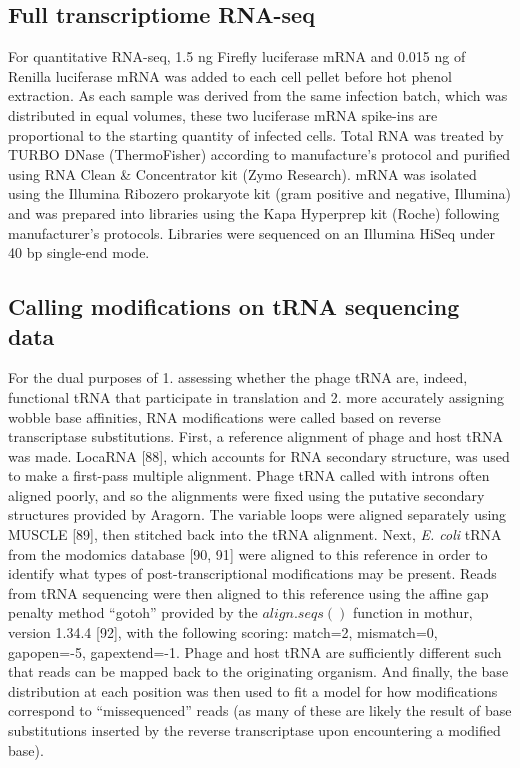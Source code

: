 \documentclass[12pt,twoside]{mitthesis-manusdown}
\begin{document}
\subsection{Full transcriptiome
RNA-seq}\label{full-transcriptiome-rna-seq}

For quantitative RNA-seq, 1.5 ng Firefly luciferase mRNA and 0.015 ng of
Renilla luciferase mRNA was added to each cell pellet before hot phenol
extraction. As each sample was derived from the same infection batch,
which was distributed in equal volumes, these two luciferase mRNA
spike-ins are proportional to the starting quantity of infected cells.
Total RNA was treated by TURBO DNase (ThermoFisher) according to
manufacture's protocol and purified using RNA Clean \& Concentrator kit
(Zymo Research). mRNA was isolated using the Illumina Ribozero
prokaryote kit (gram positive and negative, Illumina) and was prepared
into libraries using the Kapa Hyperprep kit (Roche) following
manufacturer's protocols. Libraries were sequenced on an Illumina HiSeq
under 40 bp single-end mode.

\subsection{Calling modifications on tRNA sequencing
data}\label{calling-modifications-on-trna-sequencing-data}

For the dual purposes of 1. assessing whether the phage tRNA are,
indeed, functional tRNA that participate in translation and 2. more
accurately assigning wobble base affinities, RNA modifications were
called based on reverse transcriptase substitutions. First, a reference
alignment of phage and host tRNA was made. LocaRNA {[}88{]}, which
accounts for RNA secondary structure, was used to make a first-pass
multiple alignment. Phage tRNA called with introns often aligned poorly,
and so the alignments were fixed using the putative secondary structures
provided by Aragorn. The variable loops were aligned separately using
MUSCLE {[}89{]}, then stitched back into the tRNA alignment. Next,
\emph{E. coli} tRNA from the modomics database {[}90, 91{]} were aligned
to this reference in order to identify what types of
post-transcriptional modifications may be present. Reads from tRNA
sequencing were then aligned to this reference using the affine gap
penalty method ``gotoh'' provided by the \(align.seqs()\) function in
mothur, version 1.34.4 {[}92{]}, with the following scoring: match=2,
mismatch=0, gapopen=-5, gapextend=-1. Phage and host tRNA are
sufficiently different such that reads can be mapped back to the
originating organism. And finally, the base distribution at each
position was then used to fit a model for how modifications correspond
to ``missequenced'' reads (as many of these are likely the result of
base substitutions inserted by the reverse transcriptase upon
encountering a modified base).
\end{document}
